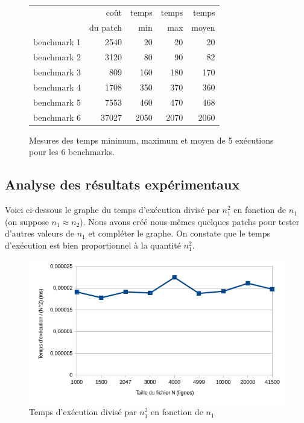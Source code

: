 \documentclass[a4paper, 10pt, french]{article}
\begin{document}
    \begin{figure}[h!]
      \begin{center}
        \begin{tabular}{|l||r||r|r|r||}
          \hline
          \hline
            & coût         & temps     & temps   & temps \\
            & du patch     & min       & max     & moyen \\
          \hline
          \hline
            benchmark 1 & 2540 & 20 & 20 & 20 \\
          \hline
            benchmark 2 & 3120 & 80 & 90 & 82 \\
          \hline
            benchmark 3 & 809 & 160 & 180 & 170 \\
          \hline
            benchmark 4 & 1708 & 350 & 370 & 360 \\
          \hline
            benchmark 5 & 7553 & 460 & 470 & 468 \\
          \hline
            benchmark 6 & 37027 & 2050 & 2070 & 2060 \\
          \hline
          \hline
        \end{tabular}
        \caption{Mesures des temps minimum, maximum et moyen de 5 exécutions pour les 6 benchmarks.}
        \label{table-temps}
      \end{center}
    \end{figure}

\newpage
\subsection{Analyse des résultats expérimentaux}

Voici ci-dessous le graphe du temps d'exécution divisé par $n_1^2$ en fonction de $n_1$ (on suppose $n_1 \approx n_2$).
Nous avons créé nous-mêmes quelques patchs pour tester d'autres valeurs de $n_1$ et compléter le graphe.
On constate que le temps d'exécution est bien proportionnel à la quantité $n_1^2$.


\begin{figure}[h!]
\begin{center}
\includegraphics[width=12cm]{exec.png}
\caption{Temps d'exécution divisé par $n_1^2$ en fonction de $n_1$}
\end{center}
\end{figure}
\end{document}
